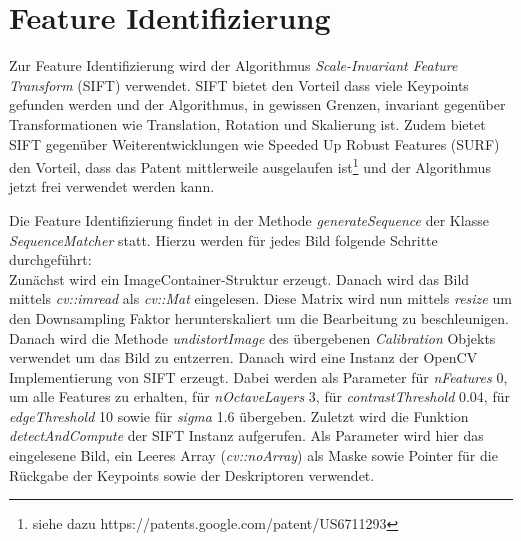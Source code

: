 \section{Feature Identifizierung}\label{sec:feature-identification}
Zur Feature Identifizierung wird der Algorithmus \emph{Scale-Invariant Feature Transform} (SIFT) verwendet.
SIFT bietet den Vorteil dass viele Keypoints gefunden werden und der Algorithmus, in gewissen Grenzen, invariant gegenüber Transformationen wie Translation, Rotation und Skalierung ist.
Zudem bietet SIFT gegenüber Weiterentwicklungen wie Speeded Up Robust Features (SURF) den Vorteil, dass das Patent mittlerweile ausgelaufen ist\footnote{siehe dazu https://patents.google.com/patent/US6711293} und der Algorithmus jetzt frei verwendet werden kann.

Die Feature Identifizierung findet in der Methode \emph{generateSequence} der Klasse \emph{SequenceMatcher} statt.
Hierzu werden für jedes Bild folgende Schritte durchgeführt:\\
Zunächst wird ein ImageContainer-Struktur erzeugt.
Danach wird das Bild mittels \emph{cv::imread} als \emph{cv::Mat} eingelesen.
Diese Matrix wird nun mittels \emph{resize} um den Downsampling Faktor herunterskaliert um die Bearbeitung zu beschleunigen.
Danach wird die Methode \emph{undistortImage} des übergebenen \emph{Calibration} Objekts verwendet um das Bild zu entzerren.
Danach wird eine Instanz der OpenCV Implementierung von SIFT erzeugt.
Dabei werden als Parameter für \emph{nFeatures} 0, um alle Features zu erhalten, für \emph{nOctaveLayers} 3, für \emph{contrastThreshold} 0.04, für \emph{edgeThreshold} 10 sowie für \emph{sigma} 1.6 übergeben.
Zuletzt wird die Funktion \emph{detectAndCompute} der SIFT Instanz aufgerufen.
Als Parameter wird hier das eingelesene Bild, ein Leeres Array (\emph{cv::noArray}) als Maske sowie Pointer für die Rückgabe der Keypoints sowie der Deskriptoren verwendet.